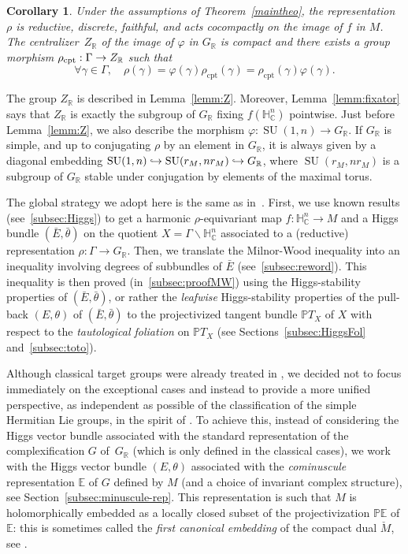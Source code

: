 \documentclass[10pt]{amsart}
\newcommand{\hto}{\mathrel{\lhook\joinrel\to}}
\newcommand{\citestar}[3]{\cite[#3]{#1}}
\theoremstyle{plain}
\newtheorem{coroA}[theoA]{Corollary}
\theoremstyle{definition}
\DeclareMathOperator{\SU}{SU}
\newcommand{\bE}{\mathbb{E}}
\newcommand{\bP}{\mathbb{P}}
\newcommand{\bR}{\mathbb{R}}
\newcommand{\HC}{{\mathbb{H}^n_\mathbb{C}}}
\newcommand{\PTX}{{\mathbb{P}T_X}}
\newcommand{\rkm}{{r_M}}
\newcommand{\rhoc}{\rho_\mathrm{cpt}}
\begin{document}
\begin{coroA}
\label{maincoro}
Under the assumptions of Theorem~\ref{maintheo}, the representation $\rho$ is reduc\-tive, discrete, faithful, and
acts cocompactly on the image of $f$ in $M$. The centralizer~$Z_\bR$ of the image of $\varphi$ in
$G_\bR$ is compact and
there exists a group morphism $\rhoc: \Gamma \to\nobreak Z_\bR$ such that
$$
\forall \gamma \in \Gamma, \quad\rho(\gamma) = \varphi(\gamma)\rhoc(\gamma) =
\rhoc(\gamma)\varphi(\gamma).
$$
\end{coroA}

The group $Z_\bR$ is described in Lemma~\ref{lemm:Z}. Moreover, Lemma~\ref{lemm:fixator} says that $Z_\bR$ is exactly the subgroup of $G_\bR$ fixing $f(\HC)$
pointwise. Just
before Lemma~\ref{lemm:Z}, we also describe the
morphism $\varphi:\SU(1,n)\to G_\bR$. If $G_\bR$ is simple, and up to conjugating $\rho$ by an
element in $G_\bR$, it is always given by a diagonal embedding
$\SU(1,n)\hto\SU(\rkm,n\rkm)\hto G_\bR$, where
$\SU(\rkm,n\rkm)$ is a subgroup of $G_\bR$ stable under conjugation by elements of the maximal torus.

The global strategy we
adopt here is the same as in~\cite{KM}.
First, we use known results (see~\ref{subsec:Higgs}) to get a harmonic $\rho$-equivariant
map $f:\HC\to M$ and a Higgs bundle $(\bar E,\bar\theta)$ on the quotient
$X=\Gamma\backslash\HC$ associated
to a (reductive) representation \hbox{$\rho:\Gamma\to G_\bR$}. Then,
we translate the
Milnor-Wood inequality into an inequality involving degrees of subbundles of $\bar E$
(see~\ref{subsec:reword}). This inequality is then proved (in~\ref{subsec:proofMW}) using the
Higgs-stability properties of
$(\bar E,\bar\theta)$,
or rather the \emph{leafwise} Higgs-stability properties of the pull-back $(E,\theta)$ of
$(\bar E,\bar\theta)$ to the
projectivized tangent bundle $\PTX$ of $X$ with respect to the \emph{tautological foliation} on $\PTX$
(see Sections~\ref{subsec:HiggsFol} and~\ref{subsec:toto}).

Although classical target groups were already treated in \cite{KM}, we decided not to focus
immediately on the exceptional cases and instead to provide a
more unified perspective, as independent as possible of the
classification of the simple Hermitian
Lie groups, in the spirit of \cite{biquard}. To achieve this, instead of considering the Higgs
vector bundle associated with the standard representation of the complexification $G$ of~$G_\bR$
(which is only defined in the classical cases), we
work with the Higgs
vector bundle $(E,\theta)$ associated with the \emph{cominuscule} representation
$\bE$ of $G$ defined by $M$ (and a choice of invariant complex structure),
see Section~\ref{subsec:minuscule-rep}. This representation is such that
$M$ is holomorphically embedded as a locally closed subset of
the projectivization $\bP\bE$ of $\bE$: this is sometimes called the \emph{first canonical
embedding} of the compact dual $\check{M}$, see \citestar{nakagawa}*{p.\,651}.
\end{document}
